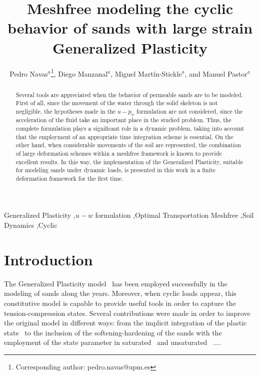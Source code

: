 \documentclass[preprint,12pt,a4paper]{elsarticle}
\begin{document}
\begin{frontmatter}

\title{Meshfree modeling the cyclic behavior of sands with large strain Generalized Plasticity}

\author{
Pedro Navas$^a$\footnote{Corresponding author: pedro.navas@upm.es},
Diego Manzanal$^a$,
Miguel Mart\'in-Stickle$^{a}$,
and  Manuel Pastor$^a$
 }
 \address{
 $^a$ ETSI Caminos, Canales y Puertos, Universidad Polit\'ectnica de Madrid.\\ c. Prof. Aranguren 3, 28040 Madrid, Spain
}

\begin{abstract}
Several tools are appreciated when the behavior of permeable sands are to be modeled. First of all, since the movement of the water through the solid skeleton is not negligible, the hypotheses made in the $u-p_w$ formulation are not considered, since the acceleration of the fluid take an important place in the studied problem. Thus, the complete formulation plays a significant role in a dynamic problem, taking into account that the employment of an appropriate time integration scheme is essential. On the other hand, when considerable movements of the soil are represented, the combination of large deformation schemes within a meshfree framework is known to provide excellent results. In this way, the implementation of the Generalized Plasticity, suitable for modeling sands under dynamic loads, is presented in this work in a finite deformation framework for the first time.
\end{abstract}

\begin{keyword}
Generalized Plasticity \sep $u-w$ formulation \sep Optimal Transportation Meshfree \sep Soil Dynamics \sep Cyclic
\end{keyword}

\end{frontmatter}

\linenumbers

\section{Introduction}
\label{sec:1}

The Generalized Plasticity model~\cite{PastorZC:90} has been employed successfully in the modeling of sands along the years. Moreover, when cyclic loads appear, this constitutive model is capable to provide useful tools in order to capture the tension-compression states. Several contributions were made in order to improve the original model in different ways: from the implicit integration of the plastic state~\cite{Mira2009} to the inclusion of the softening-hardening of the sands with the employment of the state parameter in saturated~\cite{Manzanal2011} and unsaturated~\cite{Manzanal2011a} ....
\end{document}
